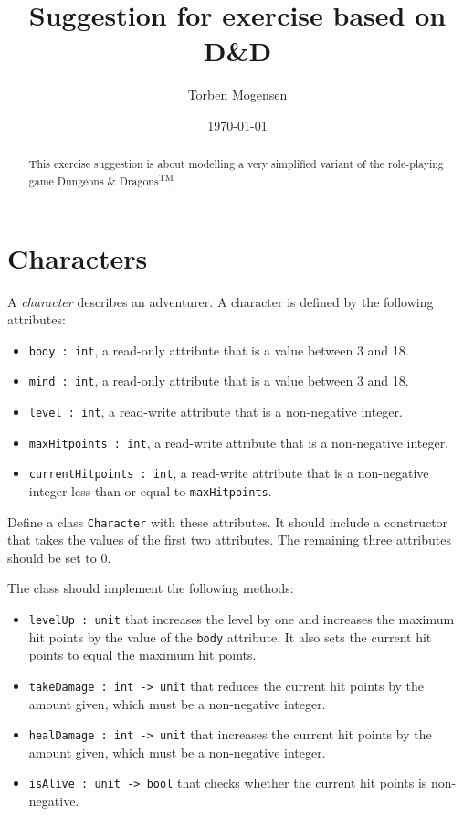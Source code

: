 \documentclass[a4paper]{article}
\begin{document}
\title{Suggestion for exercise based on D\&D}

\author{Torben Mogensen}
\date{\today}

\maketitle

\begin{abstract}
This exercise suggestion is about modelling a very simplified variant
of the role-playing game Dungeons \& Dragons\textsuperscript{\sf TM}.
\end{abstract}

\section{Characters}

A \emph{character} describes an adventurer.  A character is defined by
the following attributes:

\begin{itemize}
\item \texttt{body : int}, a read-only attribute that is a value
  between 3 and 18.
\item \texttt{mind : int}, a read-only attribute that is a value
  between 3 and 18.
\item \texttt{level : int}, a read-write attribute that is a non-negative
  integer.
\item \texttt{maxHitpoints : int}, a read-write attribute that is a
  non-negative integer.
\item \texttt{currentHitpoints : int}, a read-write attribute that is a
  non-negative integer less than or equal to \texttt{maxHitpoints}.
\end{itemize}

\noindent
Define a class \texttt{Character} with these attributes.  It should
include a constructor that takes the values of the first two
attributes.  The remaining three attributes should be set to 0.

The class should implement the following methods:

\begin{itemize}
\item \texttt{levelUp : unit} that increases the level by one and
  increases the maximum hit points by the value of the \texttt{body}
  attribute.  It also sets the current hit points to equal the maximum
  hit points.
\item \texttt{takeDamage : int -> unit}  that reduces the current hit
  points by the amount given, which must be a non-negative integer.
\item \texttt{healDamage : int -> unit} that increases the current hit
  points by the amount given, which must be a non-negative integer.
\item \texttt{isAlive : unit -> bool} that checks whether the current
  hit points is non-negative.
\end{itemize}
\end{document}
